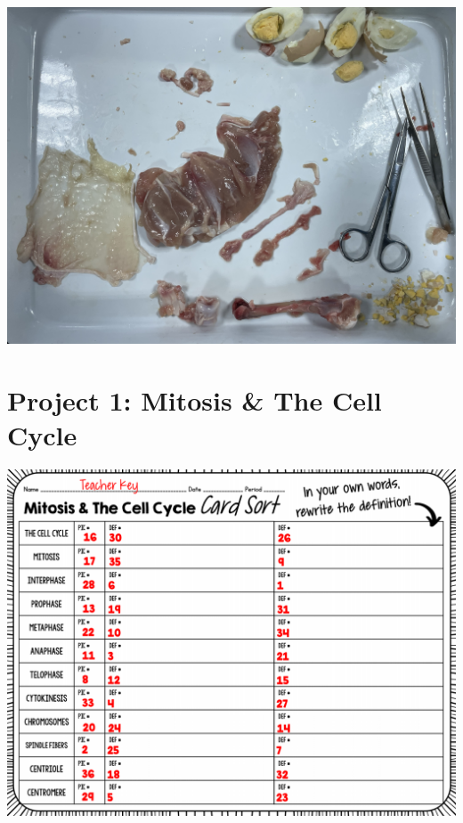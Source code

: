 \documentclass[
]{book}
\begin{document}
\includegraphics{./img/exp-2-6.jpg}

\hypertarget{project-1-mitosis-the-cell-cycle}{%
\section{Project 1: Mitosis \& The Cell Cycle}\label{project-1-mitosis-the-cell-cycle}}

\includegraphics{./img/p1-1.png}
\end{document}
